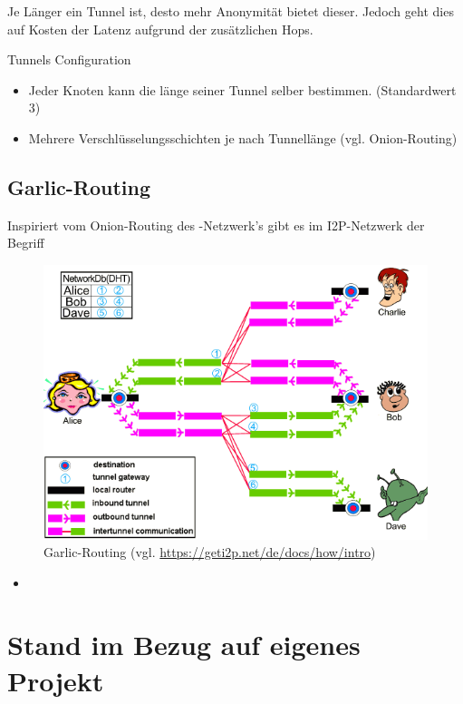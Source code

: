 Je Länger ein Tunnel ist, desto mehr Anonymität bietet dieser.
Jedoch geht dies auf Kosten der Latenz aufgrund der zusätzlichen Hops.

Tunnels Configuration
\cite{noauthor_i2p_nodate-3}


\begin{itemize}
    \item Jeder Knoten kann die länge seiner Tunnel selber bestimmen. (Standardwert 3)
    \item Mehrere Verschlüsselungsschichten je nach Tunnellänge (vgl. Onion-Routing)
\end{itemize}

\subsection{Garlic-Routing}

Inspiriert vom Onion-Routing des -Netzwerk's gibt es im I2P-Netzwerk der Begriff

\begin{figure}[H]
    \includegraphics[width=\textwidth]{img/i2prouting.png}
    \caption{Garlic-Routing (vgl. \url{https://geti2p.net/de/docs/how/intro})}
\end{figure}

\begin{itemize}
    \item
\end{itemize}

\cite{de_boer_invisible_2019}

\cite{noauthor_intro_nodate}



\section{Stand im Bezug auf eigenes Projekt}

